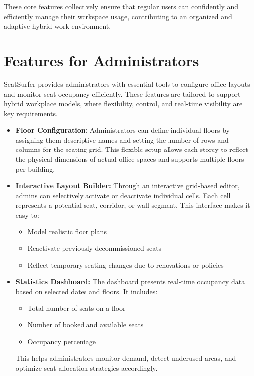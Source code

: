 \documentclass[12pt,a4paper]{report}
\begin{document}
These core features collectively ensure that regular users can confidently and efficiently manage their workspace usage, contributing to an organized and adaptive hybrid work environment.

\section{Features for Administrators}

SeatSurfer provides administrators with essential tools to configure office layouts and monitor seat occupancy efficiently. These features are tailored to support hybrid workplace models, where flexibility, control, and real-time visibility are key requirements.

\begin{itemize}
    \item \textbf{Floor Configuration:}  
    Administrators can define individual floors by assigning them descriptive names and setting the number of rows and columns for the seating grid. This flexible setup allows each storey to reflect the physical dimensions of actual office spaces and supports multiple floors per building.

    \item \textbf{Interactive Layout Builder:}  
    Through an interactive grid-based editor, admins can selectively activate or deactivate individual cells. Each cell represents a potential seat, corridor, or wall segment. This interface makes it easy to:
    \begin{itemize}
        \item Model realistic floor plans
        \item Reactivate previously decommissioned seats
        \item Reflect temporary seating changes due to renovations or policies
    \end{itemize}

    \item \textbf{Statistics Dashboard:}  
    The dashboard presents real-time occupancy data based on selected dates and floors. It includes:
    \begin{itemize}
        \item Total number of seats on a floor
        \item Number of booked and available seats
        \item Occupancy percentage
    \end{itemize}
    This helps administrators monitor demand, detect underused areas, and optimize seat allocation strategies accordingly.
\end{itemize}
\end{document}
